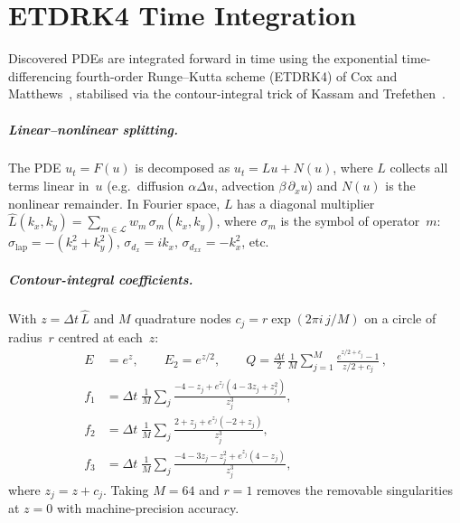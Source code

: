 \chapter{ETDRK4 Time Integration}
\label{app:etdrk4}

Discovered PDEs are integrated forward in time using the exponential
time-differencing fourth-order Runge--Kutta scheme (ETDRK4) of
Cox and Matthews~\cite{cox2002etdrk}, stabilised via the contour-integral trick of
Kassam and Trefethen~\cite{kassam2005etdrk4}.

\paragraph{Linear--nonlinear splitting.}
The PDE $u_t = F(u)$ is decomposed as $u_t = Lu + N(u)$, where
$L$ collects all terms linear in~$u$ (e.g.\ diffusion $\alpha\Delta u$,
advection $\beta\,\partial_x u$) and $N(u)$ is the nonlinear remainder.
In Fourier space, $L$ has a diagonal multiplier
$\hat L(k_x,k_y) = \sum_{m\in\mathcal{L}} w_m\,\sigma_m(k_x,k_y)$,
where $\sigma_m$ is the symbol of operator~$m$: $\sigma_{\mathrm{lap}} = -(k_x^2+k_y^2)$,
$\sigma_{d_x} = ik_x$, $\sigma_{d_{xx}} = -k_x^2$, etc.

\paragraph{Contour-integral coefficients.}
With $z = \Delta t\,\hat L$ and $M$ quadrature nodes
$c_j = r\exp(2\pi i\, j/M)$ on a circle of radius~$r$ centred at each~$z$:
\begin{align}
  E   &= e^z, \qquad E_2 = e^{z/2}, \qquad
  Q   = \frac{\Delta t}{2}\,\frac{1}{M}
        \sum_{j=1}^{M}\frac{e^{z/2+c_j} - 1}{z/2+c_j}\,,
  \label{eq:etdrk4_E} \\[4pt]
  f_1 &= \Delta t\;\frac{1}{M}\sum_j
         \frac{-4 - z_j + e^{z_j}(4 - 3z_j + z_j^2)}{z_j^3},
  \label{eq:etdrk4_f1} \\
  f_2 &= \Delta t\;\frac{1}{M}\sum_j
         \frac{2 + z_j + e^{z_j}(-2 + z_j)}{z_j^3},
  \label{eq:etdrk4_f2} \\
  f_3 &= \Delta t\;\frac{1}{M}\sum_j
         \frac{-4 - 3z_j - z_j^2 + e^{z_j}(4 - z_j)}{z_j^3},
  \label{eq:etdrk4_f3}
\end{align}
where $z_j = z + c_j$.  Taking $M=64$ and $r=1$ removes the removable
singularities at $z=0$ with machine-precision accuracy.

